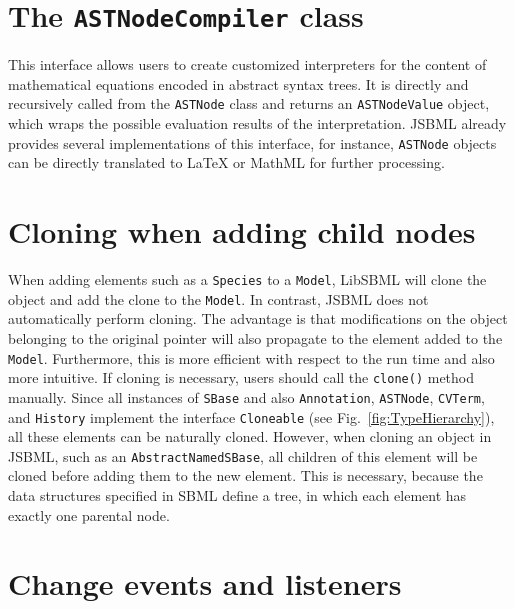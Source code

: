 \documentclass[
  letterpaper,
  11pt,
  headsepline,
  pointlessnumbers,
  tablecaptionabove,
  headinclude,
  appendixprefix,
  idxtotoc,
  bibtotoc,
  titlepage
]{scrartcl}
\begin{document}
\section{The \texttt{ASTNodeCompiler} class}

This interface allows users to create customized interpreters for the
content of mathematical equations encoded in abstract syntax trees. It
is directly and recursively called from the \verb!ASTNode! class and returns
an \verb!ASTNodeValue! object, which wraps the possible evaluation results of
the interpretation. JSBML already provides several implementations of
this interface, for instance, \verb!ASTNode! objects can be directly translated
to LaTeX or MathML for further processing.

\section{Cloning when adding child nodes}

When adding elements such as a \verb!Species! to a \verb!Model!, LibSBML will
clone the object and add the clone to the \verb!Model!. In contrast, JSBML does
not automatically perform cloning. The advantage is that modifications on the
object belonging to the original pointer will also propagate to the element
added to the \verb!Model!. Furthermore, this is more efficient with respect to
the run time and also more intuitive. If cloning is necessary, users should call
the \verb!clone()! method manually. Since all instances of \verb!SBase! and also
\verb!Annotation!, \verb!ASTNode!, \verb!CVTerm!, and \verb!History! implement
the interface \verb!Cloneable! (see Fig.~\vref{fig:TypeHierarchy}), all these
elements can be naturally cloned. However, when cloning an object in JSBML, such
as an \verb!AbstractNamedSBase!, all children of this element will be cloned
before adding them to the new element. This is necessary, because the data
structures specified in SBML define a tree, in which each element has exactly
one parental node.


\section{Change events and listeners}
\end{document}
